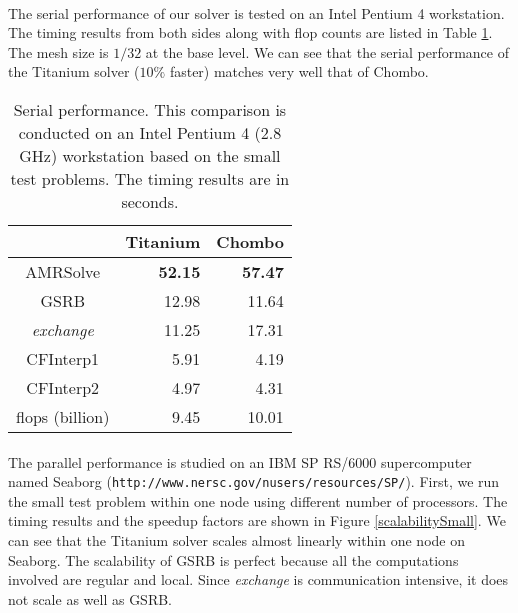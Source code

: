 \documentclass{ieee}
\numberwithin{equation}{section}
\begin{document}
\paragraph{}The serial performance of our solver is tested on an Intel Pentium 4 workstation. The timing results from both sides along with flop counts are listed in Table \ref{serial}. The mesh size is $1/32$ at the base level. We can see that the serial performance of the Titanium solver ($10\%$ faster) matches very well that of Chombo.  

\begin{table}
\begin{center}
{\small
\begin{tabular}{|c|r|r|}\hline
\  &Titanium  &Chombo   \\ \hline
AMRSolve         &{\bf 52.15} &{\bf 57.47} \\ \hline \hline
GSRB		 &12.98 &11.64 \\ \hline
{\it exchange} 	 &11.25 &17.31 \\ \hline 
CFInterp1        &5.91  &4.19 \\ \hline 
CFInterp2        &4.97  &4.31 \\ \hline \hline
flops (billion)  &9.45  &10.01  \\ \hline
\end{tabular}
}
\caption{Serial performance.  This comparison is conducted on an Intel Pentium 4 (2.8 GHz) workstation based on the small test problems. The timing results are in seconds.}\label{serial}
\end{center}
\end{table}

\paragraph{}The parallel performance is studied on an IBM SP RS/6000 supercomputer named Seaborg ({\small \tt http://www.nersc.gov/nusers/resources/SP/}). First, we run the small test problem within one node using different number of processors. The timing results and the speedup factors are shown in Figure \ref{scalabilitySmall}. We can see that the Titanium solver scales almost linearly within one node on Seaborg. The scalability of GSRB is perfect because all the computations involved are regular and local.  Since {\it exchange} is communication intensive, it does not scale as well as GSRB. 
\end{document}
